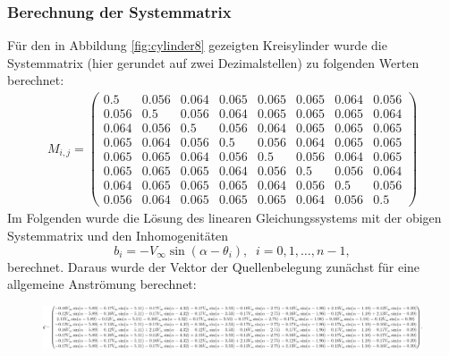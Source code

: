 \subsubsection{Berechnung der Systemmatrix}
Für den in Abbildung \ref{fig:cylinder8} gezeigten Kreisylinder wurde die Systemmatrix (hier gerundet auf zwei Dezimalstellen) zu folgenden Werten berechnet:
\begin{align*}
M_{i,j} = 
\begin{pmatrix}
0.5&0.056&0.064&0.065&0.065&0.065&0.064&0.056 \\
0.056&0.5&0.056&0.064&0.065&0.065&0.065&0.064\\
0.064&0.056&0.5&0.056&0.064&0.065&0.065&0.065\\
0.065&0.064&0.056&0.5&0.056&0.064&0.065&0.065\\
0.065&0.065&0.064&0.056&0.5&0.056&0.064&0.065\\
0.065&0.065&0.065&0.064&0.056&0.5&0.056&0.064\\
0.064&0.065&0.065&0.065&0.064&0.056&0.5&0.056\\
0.056&0.064&0.065&0.065&0.065&0.064&0.056&0.5
\end{pmatrix}
\end{align*}
Im Folgenden wurde die Lösung des linearen Gleichungssystems mit der obigen Systemmatrix und den Inhomogenitäten
\begin{equation}
b_i =  -V_{\infty} \sin{(\alpha -\theta _i)}, \;\; i= 0,1,\ldots, n-1,
\end{equation}
berechnet. Daraus wurde der Vektor der Quellenbelegung zunächst für eine allgemeine Anströmung berechnet: \\
\begin{figure}[!h]
\begin{center}
\includegraphics[scale=0.2]{figures/analytical.png} 
\label{fig:analyticalcylinder8}
\end{center}
\end{figure}

